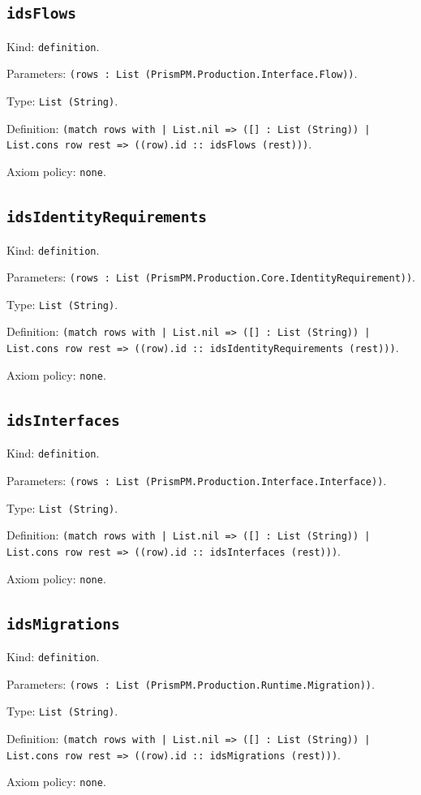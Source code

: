 \documentclass[11pt]{article}
\begin{document}
\subsection*{\texttt{idsFlows}}
\noindent Kind: \texttt{definition}.\par
\noindent Parameters: \texttt{(rows : List (PrismPM.Production.Interface.Flow))}.\par
\noindent Type: \texttt{List (String)}.\par
\noindent Definition: \texttt{(match rows with | List.nil => ([] : List (String)) | List.cons row rest => ((row).id :: idsFlows (rest)))}.\par
\noindent Axiom policy: \texttt{none}.\par
\subsection*{\texttt{idsIdentityRequirements}}
\noindent Kind: \texttt{definition}.\par
\noindent Parameters: \texttt{(rows : List (PrismPM.Production.Core.IdentityRequirement))}.\par
\noindent Type: \texttt{List (String)}.\par
\noindent Definition: \texttt{(match rows with | List.nil => ([] : List (String)) | List.cons row rest => ((row).id :: idsIdentityRequirements (rest)))}.\par
\noindent Axiom policy: \texttt{none}.\par
\subsection*{\texttt{idsInterfaces}}
\noindent Kind: \texttt{definition}.\par
\noindent Parameters: \texttt{(rows : List (PrismPM.Production.Interface.Interface))}.\par
\noindent Type: \texttt{List (String)}.\par
\noindent Definition: \texttt{(match rows with | List.nil => ([] : List (String)) | List.cons row rest => ((row).id :: idsInterfaces (rest)))}.\par
\noindent Axiom policy: \texttt{none}.\par
\subsection*{\texttt{idsMigrations}}
\noindent Kind: \texttt{definition}.\par
\noindent Parameters: \texttt{(rows : List (PrismPM.Production.Runtime.Migration))}.\par
\noindent Type: \texttt{List (String)}.\par
\noindent Definition: \texttt{(match rows with | List.nil => ([] : List (String)) | List.cons row rest => ((row).id :: idsMigrations (rest)))}.\par
\noindent Axiom policy: \texttt{none}.\par
\end{document}
